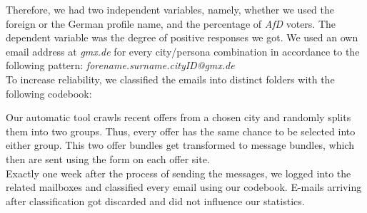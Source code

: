 \documentclass[11pt]{scrartcl}
\begin{document}
Therefore, we had two independent variables, namely, whether we used the foreign or the German profile name, and the percentage of \textit{AfD} voters. The dependent variable was the degree of positive responses we got. We used an own email address at \textit{gmx.de} for every city/persona combination in accordance to the following pattern: \textit{forename.surname.cityID@gmx.de}\\
\newpage
To increase reliability, we classified the emails into distinct folders with the following codebook:
\begin{center}
\end{center}

Our automatic tool crawls recent offers from a chosen city and randomly splits them into two groups. Thus, every offer has the same chance to be selected into either group. This two offer bundles get transformed to message bundles, which then are sent using the form on each offer site.\\
Exactly one week after the process of sending the messages, we logged into the related mailboxes and classified every email using our codebook. E-mails arriving after classification got discarded and did not influence our statistics.
\end{document}
